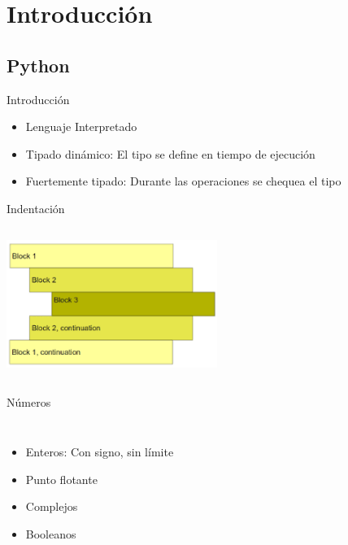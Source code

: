  \section{Introducción}
 \subsection{Python}
 \begin{frame}{Introducción}
 \begin{itemize}
    \item{Lenguaje Interpretado}
    \item{Tipado dinámico: El tipo se define en tiempo de ejecución}
    \item{Fuertemente tipado: Durante las operaciones se chequea el tipo}
 \end{itemize}
    \vfill
 \end{frame}
 \begin{frame}{Indentación}
    \begin{columns}[onlytextwidth]
       \center\includegraphics[width=0.9\textwidth]{python/indentado}
       
    \end{columns}
    \vfill
 \end{frame}
 \begin{frame}{Números}
    \begin{columns}[onlytextwidth]
       \begin{itemize}
          \item{Enteros: Con signo, sin límite}
          \item{Punto flotante}
          \item{Complejos}
          \item{Booleanos}
       \end{itemize}
       
    \end{columns}
    \vfill
 \end{frame}
